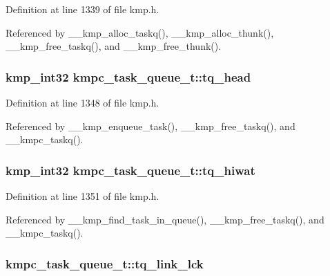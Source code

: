 Definition at line 1339 of file kmp.\-h.



Referenced by \-\_\-\-\_\-kmp\-\_\-alloc\-\_\-taskq(), \-\_\-\-\_\-kmp\-\_\-alloc\-\_\-thunk(), \-\_\-\-\_\-kmp\-\_\-free\-\_\-taskq(), and \-\_\-\-\_\-kmp\-\_\-free\-\_\-thunk().

\hypertarget{structkmpc__task__queue__t_a592b2cd324a0ce601c5cc875ccf2ed51}{
\subsubsection[{tq\-\_\-head}]{\setlength{\rightskip}{0pt plus 5cm}kmp\-\_\-int32 kmpc\-\_\-task\-\_\-queue\-\_\-t\-::tq\-\_\-head}}\label{structkmpc__task__queue__t_a592b2cd324a0ce601c5cc875ccf2ed51}


Definition at line 1348 of file kmp.\-h.



Referenced by \-\_\-\-\_\-kmp\-\_\-enqueue\-\_\-task(), \-\_\-\-\_\-kmp\-\_\-free\-\_\-taskq(), and \-\_\-\-\_\-kmpc\-\_\-taskq().

\hypertarget{structkmpc__task__queue__t_aeda8f2eb9c68ba154a41c7c839473fec}{
\subsubsection[{tq\-\_\-hiwat}]{\setlength{\rightskip}{0pt plus 5cm}kmp\-\_\-int32 kmpc\-\_\-task\-\_\-queue\-\_\-t\-::tq\-\_\-hiwat}}\label{structkmpc__task__queue__t_aeda8f2eb9c68ba154a41c7c839473fec}


Definition at line 1351 of file kmp.\-h.



Referenced by \-\_\-\-\_\-kmp\-\_\-find\-\_\-task\-\_\-in\-\_\-queue(), \-\_\-\-\_\-kmp\-\_\-free\-\_\-taskq(), and \-\_\-\-\_\-kmpc\-\_\-taskq().

\hypertarget{structkmpc__task__queue__t_ab58a0e786802a553d6a8982490ec868b}{
\subsubsection[{tq\-\_\-link\-\_\-lck}]{ kmpc\-\_\-task\-\_\-queue\-\_\-t\-::tq\-\_\-link\-\_\-lck}}\label{structkmpc__task__queue__t_ab58a0e786802a553d6a8982490ec868b}


